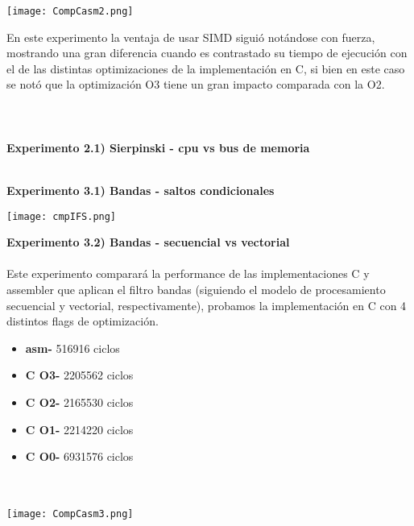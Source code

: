 \documentclass[a4paper]{article}
\begin{document}
\texttt{[image: CompCasm2.png]}

En este experimento la ventaja de usar SIMD sigui\'{o} not\'{a}ndose con fuerza, mostrando una gran diferencia cuando es contrastado su tiempo de ejecuci\'{o}n con el de las distintas optimizaciones de la implementaci\'{o}n en C, si bien en este caso se not\'{o} que la optimizaci\'{o}n O3 tiene un gran impacto comparada con la O2. \\ \\ \\ \\

\textbf{Experimento 2.1) Sierpinski - cpu vs bus de memoria}\\ \\

\newpage

\textbf{Experimento 3.1) Bandas - saltos condicionales}



\texttt{[image: cmpIFS.png]}

\newpage

\textbf{Experimento 3.2) Bandas - secuencial vs vectorial}\\ \\

Este experimento comparar\'{a} la performance de las implementaciones C y assembler que aplican el filtro bandas (siguiendo el modelo de procesamiento secuencial y vectorial, respectivamente), probamos la implementaci\'{o}n en C con 4 distintos flags de optimizaci\'{o}n.

\begin{itemize}

\item \textbf{asm-}  516916 ciclos\\
\item \textbf{C O3-} 2205562 ciclos\\
\item \textbf{C O2-} 2165530 ciclos\\
\item \textbf{C O1-} 2214220 ciclos\\
\item \textbf{C O0-} 6931576 ciclos\\ \\ \\

\end{itemize}

\texttt{[image: CompCasm3.png]}
\end{document}
